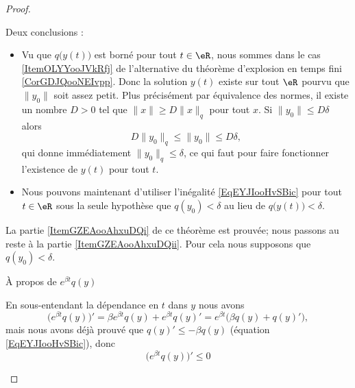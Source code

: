 \begin{proof}
\begin{subproof}
    Deux conclusions :
    \begin{itemize}
        \item
            Vu que \( q\big( y(t) \big)\) est borné pour tout \( t\in \eR\), nous sommes dans le cas \ref{ItemOLYYooJVkRfj} de l'alternative du théorème d'explosion en temps fini \ref{CorGDJQooNEIvpp}. Donc la solution \( y(t)\) existe sur tout \( \eR\) pourvu que \( \| y_0 \|\) soit assez petit. Plus précisément par équivalence des normes, il existe un nombre \( D>0\) tel que \( \| x \|\geq D\| x \|_q\) pour tout \( x\). Si \( \| y_0 \|\leq D\delta\) alors 
            \begin{equation}
                D\| y_0 \|_q\leq \| y_0 \|\leq D\delta,
            \end{equation}
            qui donne immédiatement \( \| y_0 \|_q\leq \delta\), ce qui faut pour faire fonctionner l'existence de \( y(t)\) pour tout \( t\).
        \item 
            Nous pouvons maintenant d'utiliser l'inégalité \eqref{EqEYJIooHvSBic} pour tout \( t\in \eR\) sous la seule hypothèse que \( q(y_0)<\delta\) au lieu de \( q\big( y(t) \big)<\delta\).
    \end{itemize}

    La partie \ref{ItemGZEAooAhxuDQi} de ce théorème est prouvée; nous passons au reste à la partie \ref{ItemGZEAooAhxuDQii}. Pour cela nous supposons que \( q(y_0)<\delta\).

\item[À propos de \(  e^{\beta t}q(y)\)]

    En sous-entendant la dépendance en \( t\) dans \( y\) nous avons
    \begin{equation}
        \Big(  e^{\beta t}q(y) \Big)'=\beta e^{\beta t}q(y)+ e^{\beta t}q(y)'= e^{\beta t}\big( \beta q(y)+q(y)' \big),
    \end{equation}
    mais nous avons déjà prouvé que \( q(y)'\leq -\beta q(y)\) (équation \eqref{EqEYJIooHvSBic}), donc
    \begin{equation}    \label{EqEJMEooFKuxTv}
        \Big(  e^{\beta t}q(y) \Big)'\leq 0
    \end{equation}


\end{subproof}
\end{proof}
